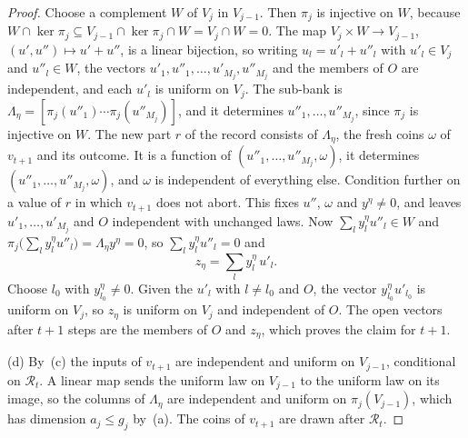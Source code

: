 \begin{proof}
Choose a complement $W$ of $V_j$ in $V_{j-1}$. Then $\pi_j$ is injective on $W$, because $W \cap \ker\pi_j \subseteq V_{j-1}\cap\ker\pi_j \cap W = V_j \cap W = 0$. The map $V_j \times W \to V_{j-1}$, $(u', u'') \mapsto u' + u''$, is a linear bijection, so writing $u_l = u'_l + u''_l$ with $u'_l \in V_j$ and $u''_l \in W$, the vectors $u'_1, u''_1, \dots, u'_{M_j}, u''_{M_j}$ and the members of $O$ are independent, and each $u'_l$ is uniform on $V_j$. The sub-bank is $\Lambda_\eta = [\pi_j(u''_1)\cdots\pi_j(u''_{M_j})]$, and it determines $u''_1,\dots,u''_{M_j}$, since $\pi_j$ is injective on $W$. The new part $r$ of the record consists of $\Lambda_\eta$, the fresh coins $\omega$ of $v_{t+1}$ and its outcome. It is a function of $(u''_1,\dots,u''_{M_j},\omega)$, it determines $(u''_1,\dots,u''_{M_j},\omega)$, and $\omega$ is independent of everything else. Condition further on a value of $r$ in which $v_{t+1}$ does not abort. This fixes $u''$, $\omega$ and $y^\eta \ne 0$, and leaves $u'_1,\dots,u'_{M_j}$ and $O$ independent with unchanged laws. Now $\sum_l y^\eta_lu''_l \in W$ and $\pi_j\bigl(\sum_ly^\eta_lu''_l\bigr) = \Lambda_\eta y^\eta = 0$, so $\sum_ly^\eta_lu''_l = 0$ and
\[
  z_\eta = \sum_l y^\eta_l\,u'_l .
\]
Choose $l_0$ with $y^\eta_{l_0} \ne 0$. Given the $u'_l$ with $l \ne l_0$ and $O$, the vector $y^\eta_{l_0}u'_{l_0}$ is uniform on $V_j$, so $z_\eta$ is uniform on $V_j$ and independent of $O$. The open vectors after $t+1$ steps are the members of $O$ and $z_\eta$, which proves the claim for $t+1$.

(d) By~(c) the inputs of $v_{t+1}$ are independent and uniform on $V_{j-1}$, conditional on $\mathcal{R}_t$. A linear map sends the uniform law on $V_{j-1}$ to the uniform law on its image, so the columns of $\Lambda_\eta$ are independent and uniform on $\pi_j(V_{j-1})$, which has dimension $a_j \le g_j$ by~(a). The coins of $v_{t+1}$ are drawn after $\mathcal{R}_t$.
\end{proof}

